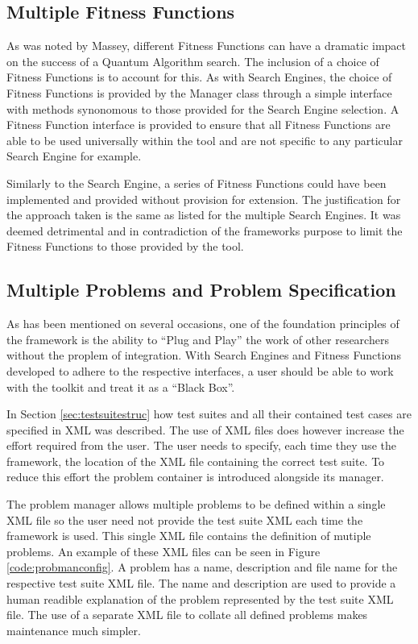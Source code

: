 \subsection{Multiple Fitness Functions}
\label{sec:mulsuitmeas}
As was noted by Massey\cite{masseythesis}, different Fitness Functions can have a dramatic impact on the success of a Quantum Algorithm search.
The inclusion of a choice of Fitness Functions is to account for this.
As with Search Engines, the choice of Fitness Functions is provided by the Manager class through a simple interface with methods synonomous to those provided for the Search Engine selection.
A Fitness Function interface is provided to ensure that all Fitness Functions are able to be used universally within the tool and are not specific to any particular Search Engine for example.

Similarly to the Search Engine, a series of Fitness Functions could have been implemented and provided without provision for extension.
The justification for the approach taken is the same as listed for the multiple Search Engines.
It was deemed detrimental and in contradiction of the frameworks purpose to limit the Fitness Functions to those provided by the tool.


\subsection{Multiple Problems and Problem Specification}
\label{sec:problemman}
As has been mentioned on several occasions, one of the foundation principles of the framework is the ability to ``Plug and Play'' the work of other researchers without the proplem of integration.
With Search Engines and Fitness Functions developed to adhere to the respective interfaces, a user should be able to work with the toolkit and treat it as a ``Black Box''.

In Section \ref{sec:testsuitestruc} how test suites and all their contained test cases are specified in XML was described.
The use of XML files does however increase the effort required from the user.
The user needs to specify, each time they use the framework, the location of the XML file containing the correct test suite.
To reduce this effort the problem container is introduced alongside its manager.

The problem manager allows multiple problems to be defined within a single XML file so the user need not provide the test suite XML each time the framework is used.
This single XML file contains the definition of mutiple problems.
An example of these XML files can be seen in Figure \ref{code:probmanconfig}.
A problem has a name, description and file name for the respective test suite XML file.
The name and description are used to provide a human readible explanation of the problem represented by the test suite XML file.
The use of a separate XML file to collate all defined problems makes maintenance much simpler.

